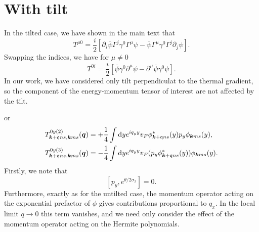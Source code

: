 \section{With tilt}
In the tilted case, we have shown in the main text that
%
\[
  T^{\mu 0} = \frac{i}{2}
  \left[\partial_i \bar{\psi} \Gamma^j \gamma^0 \Gamma^{\mu} \psi
    - \bar{\psi} \Gamma^{\mu} \gamma^0 \Gamma^j \partial_j \psi
  \right].
\]
Swapping the indices, we have for \( \mu \neq 0 \)~\cite{vanderwurffMagnetovorticalThermoelectricTransport2019}
\[
  T^{0 i} = \frac{i}{2} [\bar{\psi} \gamma^0 \partial^{\mu } \psi
  - \partial^{\mu }\bar{\psi} \gamma^{0 } \psi ].
\]
In our work, we have considered only tilt perpendiculat to the thermal gradient,  so the component of the energy-momentum tensor of interest are not affected by the tilt.

or
\begin{align}
  T_{\bm{k} + \mathfrak{q} ns, \bm{k} ms}^{0y (2)} (\bm{q}) &=
                                                             + \frac{1}{4} \int \mathrm{d} y
                                                             e^{iq_{y} y} v_{F}
                                                             \phi ^{*}_{\bm{k}+\mathfrak{q} ns} (y) p_{y} \phi _{\bm{k} m s} (y),\\
  T_{\bm{k} + \mathfrak{q} ns, \bm{k} ms}^{0y (3)} (\bm{q}) &=
                                                             - \frac{1}{4} \int \mathrm{d} y
                                                             e^{iq_{y} y} v_{F}
                                                             (p_{y} \phi ^{*}_{\bm{k}+\mathfrak{q} ns} (y))  \phi _{\bm{k} m s} (y).
\end{align}
Firstly, we note that
\[
  [p_{y} , e^{\theta /2 \sigma _{x}}] = 0.
\]
Furthermore, exactly as for the untilted case, the momentum operator acting on the exponential prefactor of \(\phi \) gives contributions proportional to \(q_{x}\).
In the local limit \(q\to  0\) this term vanishes, and we need only consider the effect of the momentum operator acting on the Hermite polynomials.

